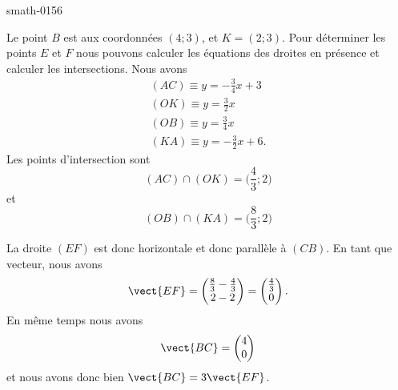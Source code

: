 
\begin{corrige}{smath-0156}

Le point \( B\) est aux coordonnées \( (4;3)\), et \( K=(2;3)\). Pour déterminer les points \( E\) et \( F\) nous pouvons calculer les équations des droites en présence et calculer les intersections. Nous avons
\begin{subequations}
    \begin{align}
        (AC)\equiv y=-\frac{ 3 }{ 4 }x+3\\
        (OK)\equiv y=\frac{ 3 }{2}x\\
        (OB)\equiv y=\frac{ 3 }{ 4 }x\\
        (KA)\equiv y=-\frac{ 3 }{2}x+6.
    \end{align}
\end{subequations}
Les points d'intersection sont 
\begin{equation}
    (AC)\cap (OK)=\big( \frac{ 4 }{ 3 };2 \big)
\end{equation}
et
\begin{equation}
    (OB)\cap (KA)=\big( \frac{ 8 }{ 3 };2 \big)
\end{equation}

La droite \( (EF) \) est donc horizontale et donc parallèle à \( (CB)\). En tant que vecteur, nous avons
\begin{equation}
    \vect{ EF }=\begin{pmatrix}
        \frac{ 8 }{ 3 }-\frac{ 4 }{ 3 }    \\ 
        2-2    
    \end{pmatrix}=\begin{pmatrix}
        \frac{ 4 }{ 3 }    \\ 
        0    
    \end{pmatrix}.
\end{equation}
En même temps nous avons
\begin{equation}
    \vect{ BC }=\begin{pmatrix}
        4    \\ 
        0    
    \end{pmatrix}
\end{equation}
et nous avons donc bien \( \vect{ BC }=3\vect{ EF }\).


\end{corrige}
